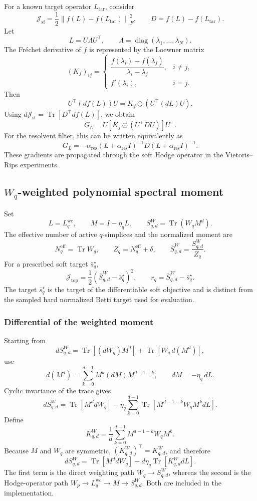 \documentclass[pdflatex,sn-mathphys-num]{sn-jnl}%
\theoremstyle{thmstyleone}%
\theoremstyle{thmstyletwo}%
\theoremstyle{thmstylethree}%
\begin{document}
\begin{appendices}
For a known target operator \(L_{\mathrm{tar}}\), consider
\[
\mathcal J_{\mathrm{sf}}
=
\frac12
\left\|
f(L)-f(L_{\mathrm{tar}})
\right\|_F^2,
\qquad
D=f(L)-f(L_{\mathrm{tar}}).
\]
Let
\[
L=U\Lambda U^\top,
\qquad
\Lambda=\operatorname{diag}(\lambda_1,\ldots,\lambda_N).
\]
The Fr\'echet derivative of \(f\) is represented by the Loewner matrix
\[
(K_f)_{ij}
=
\begin{cases}
\dfrac{f(\lambda_i)-f(\lambda_j)}
{\lambda_i-\lambda_j},
& i\neq j,\\[2mm]
f'(\lambda_i),
& i=j.
\end{cases}
\]
Then
\[
U^\top(df(L))U
=
K_f\odot
\left(U^\top(dL)U\right).
\]
Using
\(d\mathcal J_{\mathrm{sf}}
=
\operatorname{Tr}[D^\top df(L)]\),
we obtain
\[
G_L
=
U
\left[
K_f\odot
\left(U^\top D U\right)
\right]
U^\top.
\]
For the resolvent filter, this can be written equivalently as
\[
G_L
=
-\alpha_{\mathrm{res}}
(L+\alpha_{\mathrm{res}}I)^{-1}
D
(L+\alpha_{\mathrm{res}}I)^{-1}.
\]
These gradients are propagated through the soft Hodge operator in the Vietoris--Rips experiments.

\subsection{\texorpdfstring{\(W_q\)-weighted polynomial spectral moment}{Wq-weighted polynomial spectral moment}}

Set
\[
L=L_q^{\mathrm{wc}},
\qquad
M=I-\eta_qL,
\qquad
S_{q,d}^{W}
=
\operatorname{Tr}(W_qM^d).
\]
The effective number of active \(q\)-simplices and the normalized moment are
\[
N_q^{\mathrm{eff}}
=
\operatorname{Tr}W_q,
\qquad
Z_q
=
N_q^{\mathrm{eff}}+\delta,
\qquad
\overline S_{q,d}^{W}
=
\frac{S_{q,d}^{W}}{Z_q}.
\]
For a prescribed soft target \(\bar s_q^\star\),
\[
\mathcal J_{\mathrm{top}}
=
\frac12
\left(
\overline S_{q,d}^{W}
-
\bar s_q^\star
\right)^2,
\qquad
r_q
=
\overline S_{q,d}^{W}
-
\bar s_q^\star.
\]
The target \(\bar s_q^\star\) is the target of the differentiable soft objective and is distinct from the sampled hard normalized Betti target used for evaluation.

\subsubsection{Differential of the weighted moment}

Starting from
\[
dS_{q,d}^{W}
=
\operatorname{Tr}[(dW_q)M^d]
+
\operatorname{Tr}[W_q\,d(M^d)],
\]
use
\[
d(M^d)
=
\sum_{k=0}^{d-1}
M^k(dM)M^{d-1-k},
\qquad
dM=-\eta_q\,dL.
\]
Cyclic invariance of the trace gives
\[
dS_{q,d}^{W}
=
\operatorname{Tr}[M^d dW_q]
-
\eta_q
\sum_{k=0}^{d-1}
\operatorname{Tr}
\left[
M^{d-1-k}
W_q
M^k
dL
\right].
\]
Define
\[
K_{q,d}^{W}
=
\frac1d
\sum_{k=0}^{d-1}
M^{d-1-k}
W_q
M^k.
\]
Because \(M\) and \(W_q\) are symmetric,
\((K_{q,d}^{W})^\top=K_{q,d}^{W}\), and therefore
\[
dS_{q,d}^{W}
=
\operatorname{Tr}[M^d dW_q]
-
d\eta_q
\operatorname{Tr}
[K_{q,d}^{W}dL].
\]
The first term is the direct weighting path \(W_q\to S_{q,d}^{W}\), whereas the second is the Hodge-operator path \(W_p\to L_q^{\mathrm{wc}}\to M\to S_{q,d}^{W}\). Both are included in the implementation.


\end{appendices}
\end{document}
